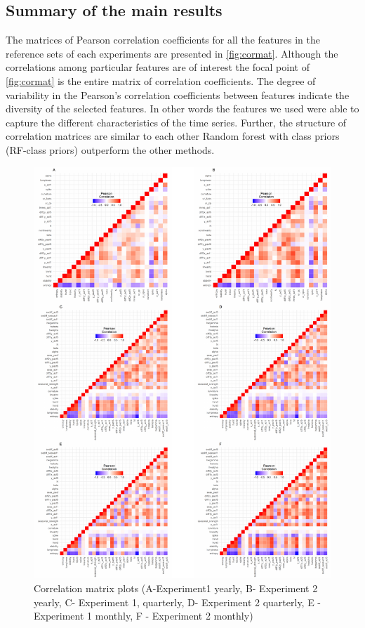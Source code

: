 \documentclass[11pt,a4paper,]{article}
\theoremstyle{definition}
\theoremstyle{definition}
\theoremstyle{definition}
\theoremstyle{remark}
\begin{document}
\subsection{Summary of the main
results}\label{summary-of-the-main-results}

\label{sec:results}

The matrices of Pearson correlation coefficients for all the features in
the reference sets of each experiments are presented in
\autoref{fig:cormat}. Although the correlations among particular
features are of interest the focal point of \autoref{fig:cormat} is the
entire matrix of correlation coefficients. The degree of variability in
the Pearson's correlation coefficients between features indicate the
diversity of the selected features. In other words the features we used
were able to capture the different characteristics of the time series.
Further, the structure of correlation matrices are similar to each other
Random forest with class priors (RF-class priors) outperform the other
methods.

\begin{figure}

{\centering \includegraphics[width=\textwidth]{figure/cormat-1} 

}

\caption{ Correlation matrix plots (A-Experiment1 yearly, B- Experiment 2 yearly, C- Experiment 1, quarterly, D- Experiment 2 quarterly, E - Experiment 1 monthly, F - Experiment 2 monthly)}\label{fig:cormat}
\end{figure}
\end{document}
